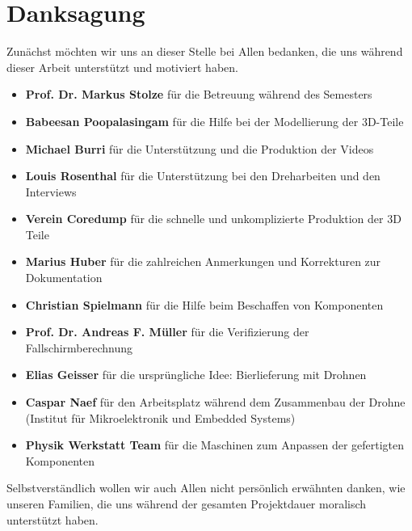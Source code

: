 \newpage
\cleardoublepage
{}
{}
\chapter*{Danksagung}
Zunächst möchten wir uns an dieser Stelle bei Allen bedanken, die uns während dieser Arbeit unterstützt und motiviert haben.
\begin{itemize}
	\item{\textbf{Prof. Dr. Markus Stolze} für die Betreuung während des Semesters}
	\item{\textbf{Babeesan Poopalasingam} für die Hilfe bei der Modellierung der 3D-Teile}
	\item{\textbf{Michael Burri} für die Unterstützung und die Produktion der Videos}
	\item{\textbf{Louis Rosenthal} für die Unterstützung bei den Dreharbeiten und den Interviews}
	\item{\textbf{Verein Coredump} für die schnelle und unkomplizierte Produktion der 3D Teile}
	\item{\textbf{Marius Huber} für die zahlreichen Anmerkungen und Korrekturen zur Dokumentation}
    \item{\textbf{Christian Spielmann} für die Hilfe beim Beschaffen von Komponenten}
	\item{\textbf{Prof. Dr. Andreas F. Müller} für die Verifizierung der Fallschirmberechnung}
	\item{\textbf{Elias Geisser} für die ursprüngliche Idee: Bierlieferung mit Drohnen}
	\item{\textbf{Caspar Naef} für den Arbeitsplatz während dem Zusammenbau der Drohne (Institut für Mikroelektronik und Embedded Systems) }
	\item{\textbf{Physik Werkstatt Team} für die Maschinen zum Anpassen der gefertigten Komponenten}
\end{itemize}
Selbstverständlich wollen wir auch Allen nicht persönlich erwähnten danken, wie unseren Familien, die uns während der gesamten Projektdauer moralisch unterstützt haben.